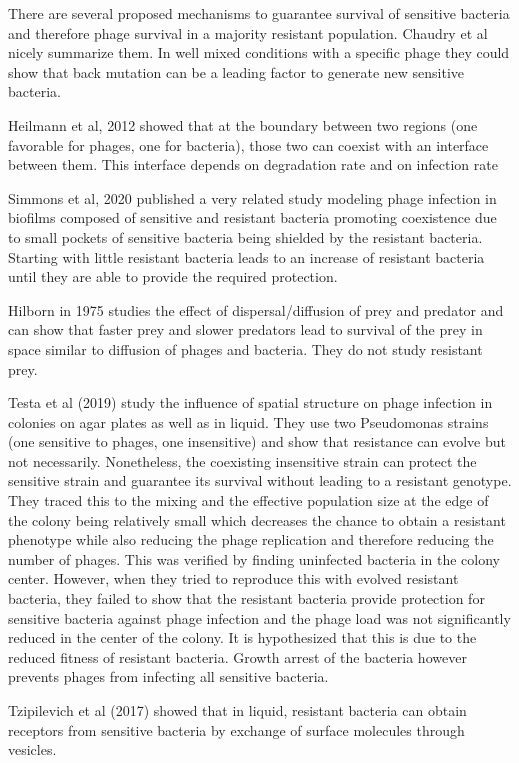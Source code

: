 There are several proposed mechanisms to guarantee survival of sensitive bacteria and therefore phage survival in a majority resistant population. Chaudry et al nicely summarize them. In well mixed conditions with a specific phage they could show that back mutation can be a leading factor to generate new sensitive bacteria.

Heilmann et al, 2012 showed that at the boundary between two regions (one favorable for phages, one for bacteria), those two can coexist with an interface between them. This interface depends on degradation rate and on infection rate

Simmons et al, 2020 published a very related study modeling phage infection in biofilms composed of sensitive and resistant bacteria promoting coexistence due to small pockets of sensitive bacteria being shielded by the resistant bacteria. Starting with little resistant bacteria leads to an increase of resistant bacteria until they are able to provide the required protection.

Hilborn in 1975 studies the effect of dispersal/diffusion of prey and predator and can show that faster prey and slower predators lead to survival of the prey in space similar to diffusion of phages and bacteria. They do not study resistant prey.

Testa et al (2019) study the influence of spatial structure on phage infection in colonies on agar plates as well as in liquid. They use two Pseudomonas strains (one sensitive to phages, one insensitive) and show that resistance can evolve but not necessarily. Nonetheless, the coexisting insensitive strain can protect the sensitive strain and guarantee its survival without leading to a resistant genotype. They traced this to the mixing and the effective population size at the edge of the colony being relatively small which decreases the chance to obtain a resistant phenotype while also reducing the phage replication and therefore reducing the number of phages. This was verified by finding uninfected bacteria in the colony center. However, when they tried to reproduce this with evolved resistant bacteria, they failed to show that the resistant bacteria provide protection for sensitive bacteria against phage infection and the phage load was not significantly reduced in the center of the colony. It is hypothesized that this is due to the reduced fitness of resistant bacteria. Growth arrest of the bacteria however prevents phages from infecting all sensitive bacteria.

Tzipilevich et al (2017) showed that in liquid, resistant bacteria can obtain receptors from sensitive bacteria by exchange of surface molecules through vesicles.

